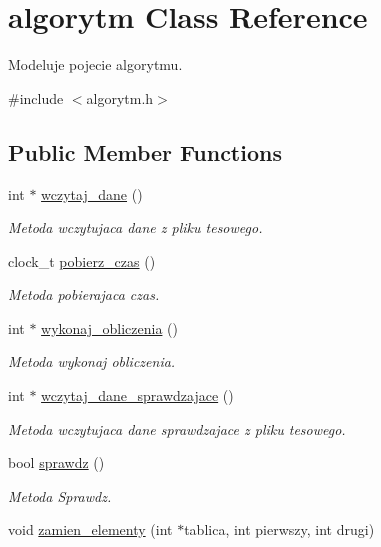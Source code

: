 \hypertarget{classalgorytm}{\section{algorytm Class Reference}
\label{classalgorytm}
}


Modeluje pojecie algorytmu.  




{\ttfamily \#include $<$algorytm.\-h$>$}

\subsection*{Public Member Functions}
\begin{DoxyCompactItemize}
\item 
int $\ast$ \hyperlink{classalgorytm_aa2512ee12d0f4dd322b2ae38e0104728}{wczytaj\-\_\-dane} ()
\begin{DoxyCompactList}\small\item\em Metoda wczytujaca dane z pliku tesowego. \end{DoxyCompactList}\item 
clock\-\_\-t \hyperlink{classalgorytm_afcbc1b3cc38d93c42525cb310cf013ac}{pobierz\-\_\-czas} ()
\begin{DoxyCompactList}\small\item\em Metoda pobierajaca czas. \end{DoxyCompactList}\item 
int $\ast$ \hyperlink{classalgorytm_a78f39eb60ed01731efe1b69af93b0ab1}{wykonaj\-\_\-obliczenia} ()
\begin{DoxyCompactList}\small\item\em Metoda wykonaj obliczenia. \end{DoxyCompactList}\item 
int $\ast$ \hyperlink{classalgorytm_a218800ae392b95a6f257538940ee0c12}{wczytaj\-\_\-dane\-\_\-sprawdzajace} ()
\begin{DoxyCompactList}\small\item\em Metoda wczytujaca dane sprawdzajace z pliku tesowego. \end{DoxyCompactList}\item 
bool \hyperlink{classalgorytm_a238208b7d91fb5bf21c2262dfade6add}{sprawdz} ()
\begin{DoxyCompactList}\small\item\em Metoda Sprawdz. \end{DoxyCompactList}\item 
void \hyperlink{classalgorytm_ae0bcecdcf531d82d6f7fe07b669e8953}{zamien\-\_\-elementy} (int $\ast$tablica, int pierwszy, int drugi)

\end{DoxyCompactItemize}
